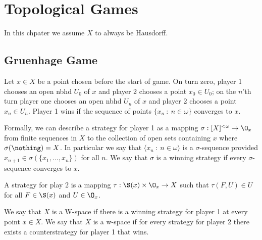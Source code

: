 \documentclass{article}
\begin{document}
\section{Topological Games}
In this chpater we assume \(X\) to always be Hausdorff.
\subsection{Gruenhage Game}

Let \(x \in X\) be a point chosen before the start of game. On turn zero, player 1 chooses an open nbhd \(U_0\) of \(x\) and player 2 chooses a point \(x_0 \in U_0\); on the \(n\)'th turn player one chooses an open nbhd \(U_n\) of \(x\) and player 2 chooses a point \(x_n \in U_n\). Player 1 wins if the sequence of points \(\{x_n \: : \: n \in \omega\}\) converges to \(x\).

Formally, we can describe a strategy for player 1 as a mapping \(\sigma: [X]^{<\omega} \to \O_x\) from finite sequences in \(X\) to the collection of open sets containing \(x\) where \(\sigma(\nothing) = X\). In particular we say that \(\langle x_n \: : \: n \in \omega\rangle\) is a \(\sigma\)-sequence provided \(x_{n + 1} \in \sigma(\{x_1, \dots, x_n\})\) for all \(n\). We say that \(\sigma\) is a winning strategy if every \(\sigma\)-sequence converges to \(x\).

A strategy for play 2 is a mapping \(\tau: \S(x) \times \O_x \to X\) such that \(\tau(F, U) \in U\) for all \(F \in \S(x)\) and \(U \in \O_x\).

\begin{defn}
    We say that \(X\) is a W-space if there is a winning strategy for player 1 at every point \(x \in X\).  We say that \(X\) is a w-space if for every strategy for player 2 there exists a counterstrategy for player 1 that wins.
\end{defn}
\end{document}
